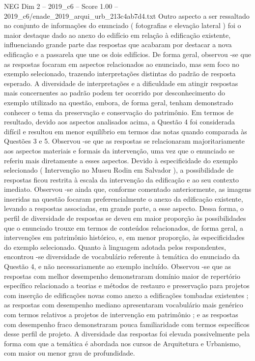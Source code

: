 \begin{textsample}{NEG Dim 2 – 2019\_c6 – Score 1.00 – 2019\_c6/enade\_2019\_arqui\_urb\_213c4ab7d4.txt}
Outro aspecto a ser ressaltado no conjunto de informações do enunciado ( fotografias e elevação lateral ) foi o maior destaque dado ao anexo do edifício em relação à edificação existente, influenciando grande parte das respostas que acabaram por destacar a nova edificação e a passarela que une os dois edifícios.
De forma geral, observou -se que as respostas focaram em aspectos relacionados ao enunciado, mas sem foco no exemplo selecionado, trazendo interpretações distintas do padrão de resposta esperado.
A diversidade de interpretações e a dificuldade em atingir respostas mais concernentes ao padrão podem ter ocorrido por desconhecimento do exemplo utilizado na questão, embora, de forma geral, tenham demonstrado conhecer o tema da preservação e conservação do patrimônio.
Em termos de resultado, devido aos aspectos analisados acima, a Questão 4 foi considerada difícil e resultou em menor equilíbrio em termos das notas quando comparada às Questões 3 e 5.
Observou -se que as respostas se relacionaram majoritariamente aos aspectos materiais e formais da intervenção, uma vez que o enunciado se referiu mais diretamente a esses aspectos.
Devido à especificidade do exemplo selecionado ( Intervenção no Museu Rodin em Salvador ), a possibilidade de respostas ficou restrita à escala da intervenção da edificação e ao seu contexto imediato.
Observou -se ainda que, conforme comentado anteriormente, as imagens inseridas na questão focaram preferencialmente o anexo da edificação existente, levando a respostas associadas, em grande parte, a esse aspecto.
Dessa forma, o perfil de diversidade de respostas se deveu em maior proporção às possibilidades que o enunciado trouxe em termos de conteúdos relacionados, de forma geral, a intervenções em patrimônio histórico, e, em menor proporção, às especificidades do exemplo selecionado.
Quanto à linguagem adotada pelos respondentes, encontrou -se diversidade de vocabulário referente à temática do enunciado da Questão 4, e não necessariamente ao exemplo incluído.
Observou -se que as respostas com melhor desempenho demonstraram domínio maior de repertório específico relacionado a teorias e métodos de restauro e preservação para projetos com inserção de edificações novas como anexo a edificações tombadas existentes ; as respostas com desempenho mediano apresentaram vocabulário mais genérico com termos relativos a projetos de intervenção em patrimônio ; e as respostas com desempenho fraco demonstraram pouca familiaridade com termos específicos desse perfil de projeto.
A diversidade das respostas foi elevada possivelmente pela forma com que a temática é abordada nos cursos de Arquitetura e Urbanismo, com maior ou menor grau de profundidade.

\end{textsample}
